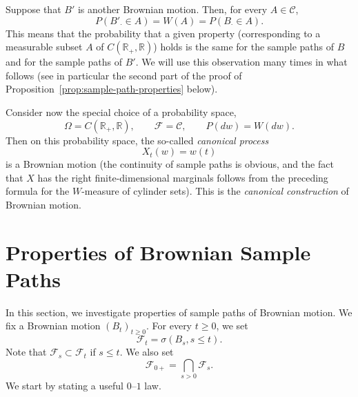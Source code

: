 \documentclass[../Main.tex]{subfiles}
\begin{document}
Suppose that $B'$ is another Brownian motion. Then, for every $A\in\mathcal C$,
\[
P(B'_\cdot\in A) = W(A) = P(B_\cdot\in A).
\]
This means that the probability that a given property (corresponding to a measurable subset $A$ of $C(\mathbb R_+,\mathbb R)$) holds is the same for the sample paths of $B$ and for the sample paths of $B'$. We will use this observation many times in what follows (see in particular the second part of the proof of Proposition~\ref{prop:sample-path-properties} below).
 
Consider now the special choice of a probability space,
\[
\Omega = C(\mathbb R_+,\mathbb R), \qquad \mathcal F = \mathcal C, \qquad P(dw) = W(dw).
\]
Then on this probability space, the so-called \emph{canonical process}
\[
X_t(w) = w(t)
\]
is a Brownian motion (the continuity of sample paths is obvious, and the fact that $X$ has the right finite-dimensional marginals follows from the preceding formula for the $W$-measure of cylinder sets). This is the \emph{canonical construction} of Brownian motion.
 
\section{Properties of Brownian Sample Paths}
In this section, we investigate properties of sample paths of Brownian motion. We fix a Brownian motion $(B_t)_{t\geq 0}$. For every $t\geq 0$, we set
\[ \mathcal F_t = \sigma(B_s, s\leq t). \]
Note that $\mathcal F_s\subset\mathcal F_t$ if $s\leq t$. We also set
\[ \mathcal F_{0+} = \bigcap_{s>0} \mathcal F_s. \]
We start by stating a useful $0$--$1$ law.
 
 
\end{document}
